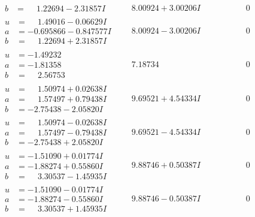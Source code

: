 \documentclass[1p]{elsarticle_modified}
\theoremstyle{definition}
\begin{document}
$$\begin{array}{c|c|c}
\begin{aligned}
b &= \phantom{-}1.22694 - 2.31857 I\end{aligned}
 & \phantom{-}8.00924 + 3.00206 I & \phantom{-0.000000 } 0 \\ \hline\begin{aligned}
u &= \phantom{-}1.49016 - 0.06629 I \\
a &= -0.695866 - 0.847577 I \\
b &= \phantom{-}1.22694 + 2.31857 I\end{aligned}
 & \phantom{-}8.00924 - 3.00206 I & \phantom{-0.000000 } 0 \\ \hline\begin{aligned}
u &= -1.49232\phantom{ +0.000000I} \\
a &= -1.81358\phantom{ +0.000000I} \\
b &= \phantom{-}2.56753\phantom{ +0.000000I}\end{aligned}
 & \phantom{-}7.18734\phantom{ +0.000000I} & \phantom{-0.000000 } 0 \\ \hline\begin{aligned}
u &= \phantom{-}1.50974 + 0.02638 I \\
a &= \phantom{-}1.57497 + 0.79438 I \\
b &= -2.75438 - 2.05820 I\end{aligned}
 & \phantom{-}9.69521 + 4.54334 I & \phantom{-0.000000 } 0 \\ \hline\begin{aligned}
u &= \phantom{-}1.50974 - 0.02638 I \\
a &= \phantom{-}1.57497 - 0.79438 I \\
b &= -2.75438 + 2.05820 I\end{aligned}
 & \phantom{-}9.69521 - 4.54334 I & \phantom{-0.000000 } 0 \\ \hline\begin{aligned}
u &= -1.51090 + 0.01774 I \\
a &= -1.88274 + 0.55860 I \\
b &= \phantom{-}3.30537 - 1.45935 I\end{aligned}
 & \phantom{-}9.88746 + 0.50387 I & \phantom{-0.000000 } 0 \\ \hline\begin{aligned}
u &= -1.51090 - 0.01774 I \\
a &= -1.88274 - 0.55860 I \\
b &= \phantom{-}3.30537 + 1.45935 I\end{aligned}
 & \phantom{-}9.88746 - 0.50387 I & \phantom{-0.000000 } 0 \\ \hline\begin{aligned}

\end{aligned}
\end{array}$$
\end{document}
